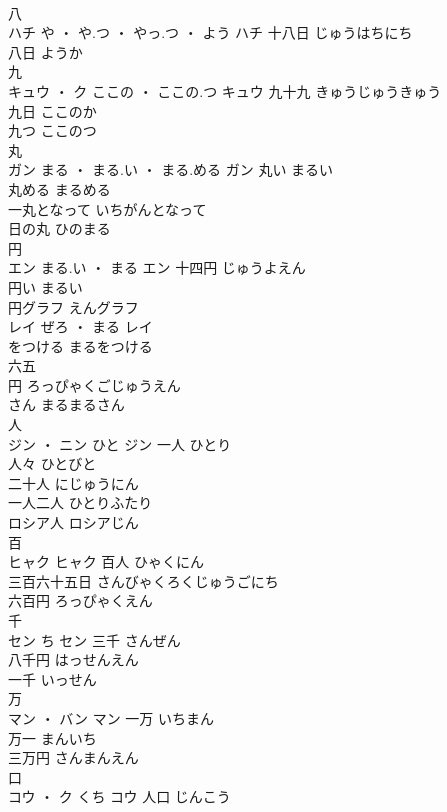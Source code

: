 \documentclass[8pt]{extreport}
\begin{document}
\begin{CJK}{UTF8}{min}
\\	八	
\\	ハチ	や ・ や.つ ・ やっ.つ ・ よう	ハチ													十八日	じゅうはちにち	
\\	八日	ようか	
\\	九	
\\	キュウ ・ ク	ここの ・ ここの.つ	キュウ	九十九	きゅうじゅうきゅう	
\\	九日	ここのか	
\\	九つ	ここのつ	
\\	丸	
\\	ガン	まる ・ まる.い ・ まる.める	ガン	丸い	まるい	
\\	丸める	まるめる	
\\	一丸となって	いちがんとなって	
\\	日の丸	ひのまる	
\\	円	
\\	エン	まる.い ・ まる	エン	十四円	じゅうよえん	
\\	円い	まるい	
\\	円グラフ	えんグラフ	
\\	レイ	ぜろ ・ まる	レイ	
\\	をつける	まるをつける	
\\	六五
\\	円	ろっぴゃくごじゅうえん	
\\	さん	まるまるさん	
\\	人	
\\	ジン ・ ニン	ひと	ジン	一人	ひとり	
\\	人々	ひとびと	
\\	二十人	にじゅうにん	
\\	一人二人	ひとりふたり	
\\	ロシア人	ロシアじん	
\\	百	
\\	ヒャク		ヒャク	百人	ひゃくにん	
\\	三百六十五日	さんびゃくろくじゅうごにち	
\\	六百円	ろっぴゃくえん	
\\	千	
\\	セン	ち	セン	三千	さんぜん	
\\	八千円	はっせんえん	
\\	一千	いっせん	
\\	万	
\\	マン ・ バン		マン	一万	いちまん	
\\	万一	まんいち	
\\	三万円	さんまんえん	
\\	口	
\\	コウ ・ ク	くち	コウ	人口	じんこう	

\end{CJK}
\end{document}
